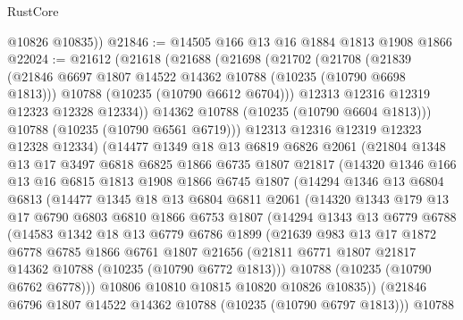 \begin{lexlean}{RustCore}
\begin{coremodule}
        @10826
        @10835))
@21846 := @14505 @166 @13 @16 @1884 @1813 @1908 @1866
@22024 := @21612
    (@21618
      (@21688
        (@21698
          (@21702
            (@21708
              (@21839
                (@21846 @6697 @1807 @14522 @14362 @10788 (@10235 (@10790 @6698 @1813)))
                @10788
                (@10235 (@10790 @6612 @6704)))
              @12313
              @12316
              @12319
              @12323
              @12328
              @12334))
          @14362
          @10788
          (@10235 (@10790 @6604 @1813)))
        @10788
        (@10235 (@10790 @6561 @6719)))
      @12313
      @12316
      @12319
      @12323
      @12328
      @12334)
    (@14477
      @1349
      @18
      @13
      @6819
      @6826
      @2061
      (@21804
        @1348
        @13
        @17
        @3497
        @6818
        @6825
        @1866
        @6735
        @1807
        @21817
        (@14320
          @1346
          @166
          @13
          @16
          @6815
          @1813
          @1908
          @1866
          @6745
          @1807
          (@14294
            @1346
            @13
            @6804
            @6813
            (@14477
              @1345
              @18
              @13
              @6804
              @6811
              @2061
              (@14320
                @1343
                @179
                @13
                @17
                @6790
                @6803
                @6810
                @1866
                @6753
                @1807
                (@14294
                  @1343
                  @13
                  @6779
                  @6788
                  (@14583
                    @1342
                    @18
                    @13
                    @6779
                    @6786
                    @1899
                    (@21639
                      @983
                      @13
                      @17
                      @1872
                      @6778
                      @6785
                      @1866
                      @6761
                      @1807
                      @21656
                      (@21811 @6771 @1807 @21817 @14362 @10788 (@10235 (@10790 @6772 @1813)))
                      @10788
                      (@10235 (@10790 @6762 @6778)))
                    @10806
                    @10810
                    @10815
                    @10820
                    @10826
                    @10835))
                (@21846 @6796 @1807 @14522 @14362 @10788 (@10235 (@10790 @6797 @1813)))
                @10788

\end{coremodule}
\end{lexlean}
